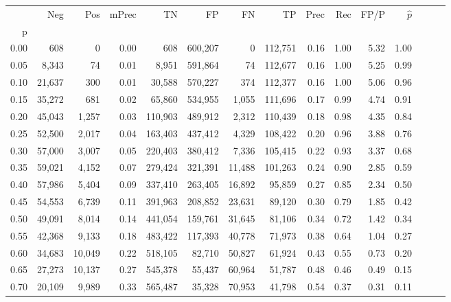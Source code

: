 \begin{tabular}{rrrrrrrrrrrrrrr}
\toprule
{} &     Neg &     Pos & mPrec &       TN &       FP &       FN &       TP &  Prec &   Rec &  FP/P & $\hat{p}$ \\
p    &         &         &       &          &          &          &          &       &       &       &           \\
\midrule
0.00 &     608 &       0 &  0.00 &      608 &  600,207 &        0 &  112,751 &  0.16 &  1.00 &  5.32 &      1.00 \\
0.05 &   8,343 &      74 &  0.01 &    8,951 &  591,864 &       74 &  112,677 &  0.16 &  1.00 &  5.25 &      0.99 \\
0.10 &  21,637 &     300 &  0.01 &   30,588 &  570,227 &      374 &  112,377 &  0.16 &  1.00 &  5.06 &      0.96 \\
0.15 &  35,272 &     681 &  0.02 &   65,860 &  534,955 &    1,055 &  111,696 &  0.17 &  0.99 &  4.74 &      0.91 \\
0.20 &  45,043 &   1,257 &  0.03 &  110,903 &  489,912 &    2,312 &  110,439 &  0.18 &  0.98 &  4.35 &      0.84 \\
0.25 &  52,500 &   2,017 &  0.04 &  163,403 &  437,412 &    4,329 &  108,422 &  0.20 &  0.96 &  3.88 &      0.76 \\
0.30 &  57,000 &   3,007 &  0.05 &  220,403 &  380,412 &    7,336 &  105,415 &  0.22 &  0.93 &  3.37 &      0.68 \\
0.35 &  59,021 &   4,152 &  0.07 &  279,424 &  321,391 &   11,488 &  101,263 &  0.24 &  0.90 &  2.85 &      0.59 \\
0.40 &  57,986 &   5,404 &  0.09 &  337,410 &  263,405 &   16,892 &   95,859 &  0.27 &  0.85 &  2.34 &      0.50 \\
0.45 &  54,553 &   6,739 &  0.11 &  391,963 &  208,852 &   23,631 &   89,120 &  0.30 &  0.79 &  1.85 &      0.42 \\
0.50 &  49,091 &   8,014 &  0.14 &  441,054 &  159,761 &   31,645 &   81,106 &  0.34 &  0.72 &  1.42 &      0.34 \\
0.55 &  42,368 &   9,133 &  0.18 &  483,422 &  117,393 &   40,778 &   71,973 &  0.38 &  0.64 &  1.04 &      0.27 \\
0.60 &  34,683 &  10,049 &  0.22 &  518,105 &   82,710 &   50,827 &   61,924 &  0.43 &  0.55 &  0.73 &      0.20 \\
0.65 &  27,273 &  10,137 &  0.27 &  545,378 &   55,437 &   60,964 &   51,787 &  0.48 &  0.46 &  0.49 &      0.15 \\
0.70 &  20,109 &   9,989 &  0.33 &  565,487 &   35,328 &   70,953 &   41,798 &  0.54 &  0.37 &  0.31 &      0.11 \\

\end{tabular}

